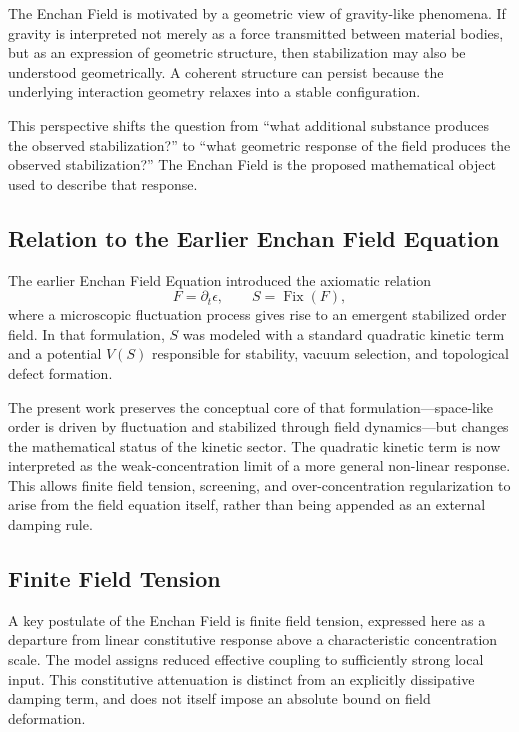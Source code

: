 \documentclass[11pt,a4paper]{article}
\begin{document}
The Enchan Field is motivated by a geometric view of gravity-like phenomena. If gravity is interpreted not merely as a force transmitted between material bodies, but as an expression of geometric structure, then stabilization may also be understood geometrically. A coherent structure can persist because the underlying interaction geometry relaxes into a stable configuration.

This perspective shifts the question from ``what additional substance produces the observed stabilization?'' to ``what geometric response of the field produces the observed stabilization?'' The Enchan Field is the proposed mathematical object used to describe that response.

\subsection{Relation to the Earlier Enchan Field Equation}

The earlier Enchan Field Equation introduced the axiomatic relation
\[
F = \partial_t \epsilon, \qquad S = \operatorname{Fix}(F),
\]
where a microscopic fluctuation process gives rise to an emergent stabilized order field. In that formulation, $S$ was modeled with a standard quadratic kinetic term and a potential $V(S)$ responsible for stability, vacuum selection, and topological defect formation.

The present work preserves the conceptual core of that formulation---space-like order is driven by fluctuation and stabilized through field dynamics---but changes the mathematical status of the kinetic sector. The quadratic kinetic term is now interpreted as the weak-concentration limit of a more general non-linear response. This allows finite field tension, screening, and over-concentration regularization to arise from the field equation itself, rather than being appended as an external damping rule.

\subsection{Finite Field Tension}

A key postulate of the Enchan Field is finite field tension, expressed here as a departure from linear constitutive response above a characteristic concentration scale. The model assigns reduced effective coupling to sufficiently strong local input. This constitutive attenuation is distinct from an explicitly dissipative damping term, and does not itself impose an absolute bound on field deformation.
\end{document}
